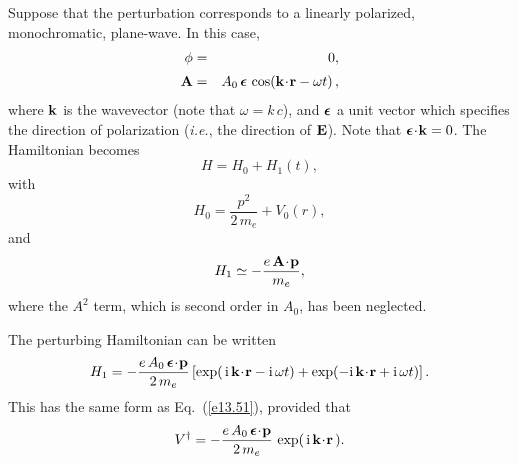 Suppose that the perturbation corresponds to a linearly polarized, monochromatic, plane-wave. In this case,
\begin{eqnarray}
\phi &=& 0,\\[0.5ex]
{\bf A} &=&  A_0 \,\mbox{\boldmath$\epsilon$}\,\cos\!\left
({\bf k}\!\cdot\!{\bf r}
- \omega t\right),
\end{eqnarray}
where ${\bf k}$ is the wavevector (note that $\omega=k\,c$), and
$\mbox{\boldmath$\epsilon$}$ a unit vector which specifies the direction of polarization ({\em i.e.}, the direction of ${\bf E}$). 
Note that $\mbox{\boldmath$\epsilon$}\!\cdot\!{\bf k} = 0$. The Hamiltonian
becomes
\begin{equation}
H = H_0 + H_1(t),
\end{equation}
with
\begin{equation}
H_0 = \frac{p^2}{2\,m_e}  + V_0(r),
\end{equation}
and
\begin{equation}\label{e13.77}
H_1 \simeq -\frac{e\,{\bf A}\!\cdot\!{\bf p}}{m_e},
\end{equation}
where the $A^2$ term, which is  second order in $A_0$, has been neglected.

The perturbing Hamiltonian can be written
\begin{equation}\label{e6.253}
H_1 = - \frac{e \,A_0\, \mbox{\boldmath$\epsilon$} \!\cdot\!{\bf p} }{2\,m_e}
\left[\exp(\,{\rm i}\,{\bf k}\!\cdot\!{\bf r} - {\rm i}\,
\omega t)+  \exp(-{\rm i}\,{\bf k}\!\cdot\!{\bf r} + {\rm i}\,
\omega t)\right].
\end{equation}
This has the same form as Eq.~(\ref{e13.51}), provided that
\begin{equation}\label{e13.79}
V^\dag = - \frac{e \,A_0\, \mbox{\boldmath$\epsilon$} \!\cdot\!{\bf p} }{2\,m_e}\, \exp(\,{\rm i}\,{\bf k}\!\cdot\!{\bf r}\,).
\end{equation}

